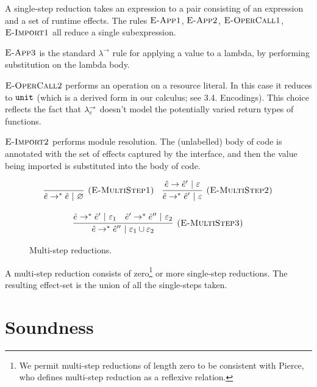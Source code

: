 \noindent
A single-step reduction takes an expression to a pair consisting of an expression and a set of runtime effects. The rules $\textsc{E-App1}$, $\textsc{E-App2}$, $\textsc{E-OperCall1}$, $\textsc{E-Import1}$ all reduce a single subexpression.

$\textsc{E-App3}$ is the standard $\lambda^{\rightarrow}$ rule for applying a value to a lambda, by performing substitution on the lambda body.

$\textsc{E-OperCall2}$ performs an operation on a resource literal. In this case it reduces to $\mathtt{unit}$ (which is a derived form in our calculus; see 3.4. Encodings). This choice reflects the fact that $\lambda^{\rightarrow}_{\varepsilon}$ doesn't model the potentially varied return types of functions. 

$\textsc{E-Import2}$ performs module resolution. The (unlabelled) body of code is annotated with the set of effects captured by the interface, and then the value being imported is substituted into the body of code.


\begin{figure}[h]

\noindent
{}

\[
\begin{array}{c}

\infer[\textsc{(E-MultiStep1)}]
	{\hat e \rightarrow^{*} \hat e~|~\varnothing}
	{}
~~~
\infer[\textsc{(E-MultiStep2)}]
	{\hat e \rightarrow^{*} \hat e'~|~\varepsilon}
	{\hat e \rightarrow \hat e'~|~\varepsilon} \\[3ex]
	
\infer[\textsc{(E-MultiStep3)}]
	{\hat e \rightarrow^{*} \hat e''~|~\varepsilon_1 \cup \varepsilon_2}
	{\hat e \rightarrow^{*} \hat e'~|~\varepsilon_1 & \hat e' \rightarrow^{*} \hat e''~|~\varepsilon_2}
\end{array}
\]

\vspace{-7pt}
\caption{Multi-step reductions.}
\label{This is the label.}
\end{figure}

\noindent
A multi-step reduction consists of zero\footnote{We permit multi-step reductions of length zero to be consistent with Pierce, who defines multi-step reduction as a reflexive relation\cite[p. 39]{tapl}.} or more single-step reductions. The resulting effect-set is the union of all the single-steps taken.

\section{Soundness}


